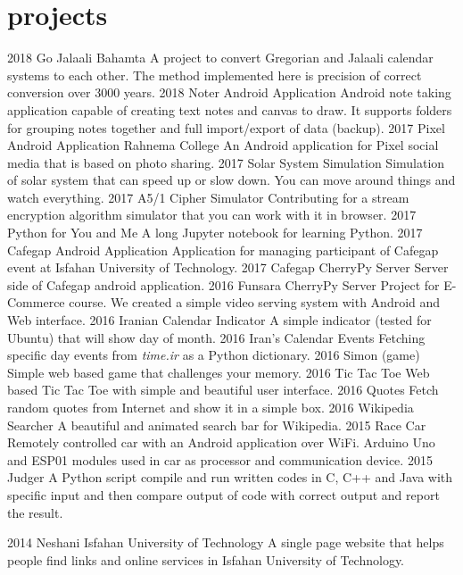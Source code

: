 \documentclass[]{friggeri-cv}
\begin{document}
\section{projects}

\begin{entrylist}
	\entry
	{2018}
	{Go Jalaali}
	{Bahamta}
	{A project to convert Gregorian and Jalaali calendar systems to each other. The method implemented here is precision of correct conversion over 3000 years.}
	\entry
	{2018}
	{Noter Android Application}
	{}
	{Android note taking application capable of creating text notes and canvas to draw. It supports folders for grouping notes together and full import/export of data (backup).}
	\entry
	{2017}
	{Pixel Android Application}
	{Rahnema College}
	{An Android application for Pixel social media that is based on photo sharing.}
	\entry
	{2017}
	{Solar System Simulation}
	{}
	{Simulation of solar system that can speed up or slow down. You can move around things and watch everything.}
	\entry
	{2017}
	{A5/1 Cipher Simulator}
	{}
	{Contributing for a stream encryption algorithm simulator that you can work with it in browser.}
	\entry
	{2017}
	{Python for You and Me}
	{}
	{A long Jupyter notebook for learning Python.}
	\entry
	{2017}
	{Cafegap Android Application}
	{}
	{Application for managing participant of Cafegap event at Isfahan University of Technology.}
	\entry
	{2017}
	{Cafegap CherryPy Server}
	{}
	{Server side of Cafegap android application.}
	\entry
	{2016}
	{Funsara CherryPy Server}
	{}
	{Project for E-Commerce course. We created a simple video serving system with Android and Web interface.}
	\entry
	{2016}
	{Iranian Calendar Indicator}
	{}
	{A simple indicator (tested for Ubuntu) that will show day of month.}
	\entry
	{2016}
	{Iran's Calendar Events}
	{}
	{Fetching specific day events from \textit{time.ir} as a Python dictionary.}
	\entry
	{2016}
	{Simon (game)}
	{}
	{Simple web based game that challenges your memory.}
	\entry
	{2016}
	{Tic Tac Toe}
	{}
	{Web based Tic Tac Toe with simple and beautiful user interface.}
	\entry
	{2016}
	{Quotes}
	{}
	{Fetch random quotes from Internet and show it in a simple box.}
	\entry
	{2016}
	{Wikipedia Searcher}
	{}
	{A beautiful and animated search bar for Wikipedia.}
	\entry
	{2015}
	{Race Car}
	{}
	{Remotely controlled car with an Android application over WiFi. Arduino Uno and ESP01 modules used in car as processor and communication device.}
	\entry
	{2015}
	{Judger}
	{}
	{A Python script compile and run written codes in C, C++ and Java with specific input and then compare output of code with correct output and report the result.}
\end{entrylist}
\begin{entrylist}
	\entry
	{2014}
	{Neshani}
	{Isfahan University of Technology}
	{A single page website that helps people find links and online services in Isfahan University of Technology.}
\end{entrylist}
\end{document}
